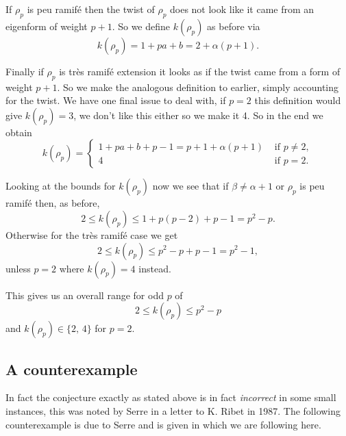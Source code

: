 \documentclass[a4paper,12pt]{article}
\begin{document}
If $\rho_p$ is peu ramif\'e then the twist of $\rho_p$ does not look like it came from an eigenform of weight $p+1$.
So we define $k(\rho_p)$ as before via
\begin{equation}\label{eq:peu}
k(\rho_p) = 1 + pa + b = 2 + \alpha(p+1).
\end{equation}

Finally if $\rho_p$ is tr\`es ramif\'e extension it looks as if the twist came from a form of weight $p+1$.
So we make the analogous definition to earlier, simply accounting for the twist.
We have one final issue to deal with, if $p=2$ this definition would give $k(\rho_p) = 3$, we don't like this either so we make it 4. %
So in the end we obtain
\begin{equation}\label{eq:tres}
k(\rho_p) = \begin{cases}
1 + pa + b + p - 1 = p + 1 + \alpha(p+1) & \text{ if }p\ne 2,\\
4 & \text{ if } p = 2.
\end{cases}
\end{equation}

Looking at the bounds for $k(\rho_p)$ now we see that if $\beta \ne \alpha + 1$ or $\rho_p$ is peu ramif\'e then, as before,
\[
2\le k(\rho_p) \le 1 + p(p-2) + p - 1 = p^2 - p. %
\]
Otherwise for the tr\`es ramif\'e case we get
\[
2\le k(\rho_p) \le p^2 - p + p -1 = p^2 - 1, %
\]
unless $p =2$ where $k(\rho_p) = 4$ instead.

This gives us an overall range for odd $p$ of
\[
2\le k(\rho_p) \le p^2 - p
\]
and $k(\rho_p) \in\{2,\,4\}$ for $p=2$.


\subsection{A counterexample}\label{subsec:counter}
In fact the conjecture exactly as stated above is in fact \emph{incorrect} in some small instances, this was noted by Serre in a letter to K. Ribet in 1987.
The following counterexample is due to Serre and is given in \cite[sec. 2]{Ribet95} which we are following here.
\end{document}
